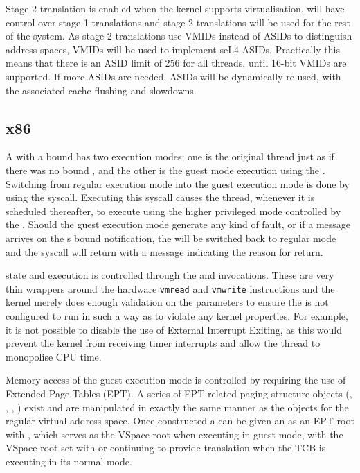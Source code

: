 Stage 2 translation is enabled when the kernel supports virtualisation.  will have control
over stage 1 translations and stage 2 translations will be used for the rest of the system.
As stage 2 translations use VMIDs instead of ASIDs to distinguish address spaces, VMIDs will be used
to implement seL4 ASIDs. Practically this means that there is an ASID limit of 256 for all threads,
until 16-bit VMIDs are supported. If more ASIDs are needed, ASIDs will be dynamically re-used, with
the associated cache flushing and slowdowns.

\subsection{x86}

A  with a bound  has two execution modes; one is the original thread just as
if there was no bound , and the other is the guest mode execution using the
. Switching from regular execution mode into the guest execution mode is
done by using the  syscall. Executing this syscall causes the thread, whenever
it is scheduled thereafter, to execute using the higher privileged mode controlled by the .
Should the guest execution mode generate any kind of fault, or if a message arrives
on the s bound notification, the  will be switched back to regular mode
and the  syscall will return with a message indicating the reason for return.

 state and execution is controlled through the 
and  invocations.
These are very thin wrappers around the hardware \texttt{vmread} and \texttt{vmwrite} instructions and the kernel
merely does enough validation on the parameters to ensure the  is not configured
to run in such a way as to violate any kernel properties. For example, it is not possible to
disable the use of External Interrupt Exiting, as this would prevent the kernel from receiving
timer interrupts and allow the thread to monopolise CPU time.

Memory access of the guest execution mode is controlled by requiring the use of Extended
Page Tables (EPT). A series of EPT related paging structure objects (, , , )
exist and are manipulated in exactly the same manner as the objects for the regular virtual
address space. Once constructed a  can be given an  as an EPT root with ,
which serves as the VSpace root when executing in guest mode, with the VSpace root set
with  or 
continuing to provide translation when the TCB is executing in its normal mode.

